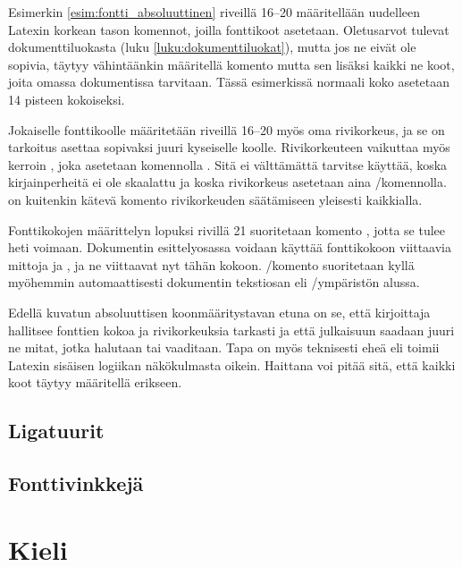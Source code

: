 \begin{koodilohkosis}
  \sffamilyabs\fontsize{16bp}{18bp}\bfseries
\end{koodilohkosis}

Esimerkin \ref{esim:fontti_absoluuttinen} riveillä 16--20 määritellään
uudelleen Latexin korkean tason komennot, joilla fonttikoot asetetaan.
Oletus\-arvot tulevat dokumenttiluokasta (luku
\ref{luku:dokumenttiluokat}), mutta jos ne eivät ole sopivia, täytyy
vähintäänkin määritellä komento  mutta sen
lisäksi kaikki ne koot, joita omassa dokumentissa tarvitaan. Tässä
esimerkissä normaali koko asetetaan 14 pisteen kokoiseksi.

Jokaiselle fonttikoolle määritetään riveillä 16--20 myös oma
rivikorkeus, ja se on tarkoitus asettaa sopivaksi juuri kyseiselle
koolle. Rivikorkeuteen vaikuttaa myös kerroin , joka asetetaan komennolla .
Sitä ei välttämättä tarvitse käyttää, koska kirjainperheitä ei ole
skaalattu ja koska rivikorkeus asetetaan aina \-/komennolla.  on kuitenkin kätevä
komento rivikorkeuden säätämiseen yleisesti kaikkialla.

Fonttikokojen määrittelyn lopuksi rivillä 21 suoritetaan komento
, jotta se tulee heti voimaan. Dokumentin
esittelyosassa voidaan käyttää fonttikokoon viittaavia mittoja
 ja , ja ne viittaavat nyt tähän kokoon.
\-/komento suoritetaan kyllä myöhemmin
automaattisesti dokumentin teksti\-osan eli
\-/ympäristön alussa.

Edellä kuvatun absoluuttisen koonmääritystavan etuna on se, että
kirjoittaja hallitsee fonttien kokoa ja rivikorkeuksia tarkasti ja että
julkaisuun saadaan juuri ne mitat, jotka halutaan tai vaaditaan. Tapa on
myös teknisesti eheä eli toimii Latexin sisäisen logiikan näkökulmasta
oikein. Haittana voi pitää sitä, että kaikki koot täytyy määritellä
erikseen.

\subsection{Ligatuurit}
\subsection{Fonttivinkkejä}

\section{Kieli}
\label{luku:kieliasetukset}

